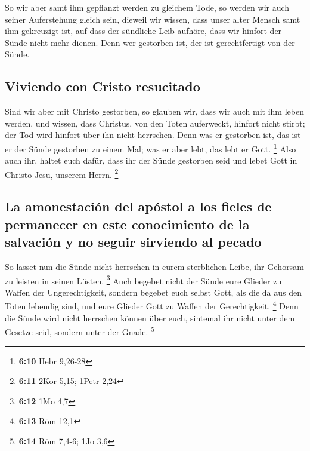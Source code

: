  So wir aber samt ihm gepflanzt werden zu gleichem Tode,
so werden wir auch seiner Auferstehung gleich sein, 
dieweil wir wissen, dass unser alter Mensch samt ihm gekreuzigt ist, auf
dass der sündliche Leib aufhöre, dass wir hinfort der Sünde nicht mehr
dienen.  Denn wer gestorben ist, der ist gerechtfertigt
von der Sünde.

\hypertarget{viviendo-con-cristo-resucitado}{%
\subsection{Viviendo con Cristo
resucitado}\label{viviendo-con-cristo-resucitado}}

 Sind wir aber mit Christo gestorben, so glauben wir, dass
wir auch mit ihm leben werden,  und wissen, dass Christus,
von den Toten auferweckt, hinfort nicht stirbt; der Tod wird hinfort
über ihn nicht herrschen.  Denn was er gestorben ist, das
ist er der Sünde gestorben zu einem Mal; was er aber lebt, das lebt er
Gott. \footnote{\textbf{6:10} Hebr 9,26-28}  Also auch
ihr, haltet euch dafür, dass ihr der Sünde gestorben seid und lebet Gott
in Christo Jesu, unserem Herrn. \footnote{\textbf{6:11} 2Kor 5,15; 1Petr
  2,24}

\hypertarget{la-amonestaciuxf3n-del-apuxf3stol-a-los-fieles-de-permanecer-en-este-conocimiento-de-la-salvaciuxf3n-y-no-seguir-sirviendo-al-pecado}{%
\subsection{La amonestación del apóstol a los fieles de permanecer en
este conocimiento de la salvación y no seguir sirviendo al
pecado}\label{la-amonestaciuxf3n-del-apuxf3stol-a-los-fieles-de-permanecer-en-este-conocimiento-de-la-salvaciuxf3n-y-no-seguir-sirviendo-al-pecado}}

 So lasset nun die Sünde nicht herrschen in eurem
sterblichen Leibe, ihr Gehorsam zu leisten in seinen Lüsten. \footnote{\textbf{6:12}
  1Mo 4,7}  Auch begebet nicht der Sünde eure Glieder zu
Waffen der Ungerechtigkeit, sondern begebet euch selbst Gott, als die da
aus den Toten lebendig sind, und eure Glieder Gott zu Waffen der
Gerechtigkeit. \footnote{\textbf{6:13} Röm 12,1}  Denn
die Sünde wird nicht herrschen können über euch, sintemal ihr nicht
unter dem Gesetze seid, sondern unter der Gnade. \footnote{\textbf{6:14}
  Röm 7,4-6; 1Jo 3,6}

